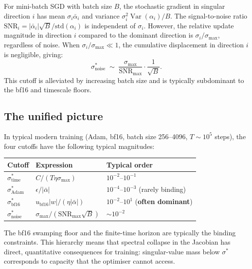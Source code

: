 For mini-batch SGD with batch size $B$, the stochastic gradient in singular direction $i$ has mean $\sigma_i \bar\alpha_i$ and variance $\sigma_i^2 \operatorname{Var}(\alpha_i) / B$. The signal-to-noise ratio $\mathrm{SNR}_i = |\bar\alpha_i|\sqrt{B}/\mathrm{std}(\alpha_i)$ is independent of $\sigma_i$. However, the relative update magnitude in direction $i$ compared to the dominant direction is $\sigma_i / \sigma_{\max}$, regardless of noise. When $\sigma_i / \sigma_{\max} \ll 1$, the cumulative displacement in direction $i$ is negligible, giving:
\begin{equation}\label{eq:sigma-noise}
\sigma^*_{\mathrm{noise}} \;\sim\; \frac{\sigma_{\max}}{\mathrm{SNR}_{\max}} \cdot \frac{1}{\sqrt{B}}.
\end{equation}
This cutoff is alleviated by increasing batch size and is typically subdominant to the bf16 and timescale floors.

\subsection{The unified picture}\label{app:stalling-unified}

In typical modern training (Adam, bf16, batch size 256--4096, $T \sim 10^5$ steps), the four cutoffs have the following typical magnitudes:

\begin{center}
\begin{tabular}{lll}
\toprule
Cutoff & Expression & Typical order \\
\midrule
$\sigma^*_{\mathrm{time}}$ & $C / (T\eta\sigma_{\max})$ & $10^{-2}$--$10^{-1}$ \\
$\sigma^*_{\mathrm{Adam}}$ & $\epsilon / |\bar\alpha|$ & $10^{-4}$--$10^{-3}$ (rarely binding) \\
$\sigma^*_{\mathrm{bf16}}$ & $u_{\mathrm{bf16}}|w| / (\eta|\bar\alpha|)$ & $10^{-2}$--$10^{1}$ (\textbf{often dominant}) \\
$\sigma^*_{\mathrm{noise}}$ & $\sigma_{\max}/(\mathrm{SNR}_{\max}\sqrt{B})$ & $\sim 10^{-2}$ \\
\bottomrule
\end{tabular}
\end{center}

\noindent The bf16 swamping floor and the finite-time horizon are typically the binding constraints. This hierarchy means that spectral collapse in the Jacobian has direct, quantitative consequences for training: singular-value mass below $\sigma^*$ corresponds to capacity that the optimiser cannot access.

